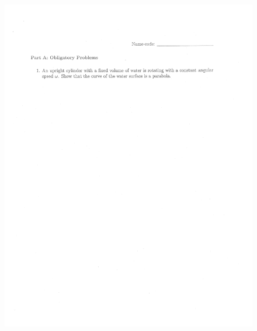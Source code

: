 \documentclass[10pt,a4paper]{article}
\begin{document}
\begin{figure}[H]
 \centering
 \includegraphics[width=16cm]{pdf/1-1T46.png}
\end{figure}
 \newpage
\end{document}
